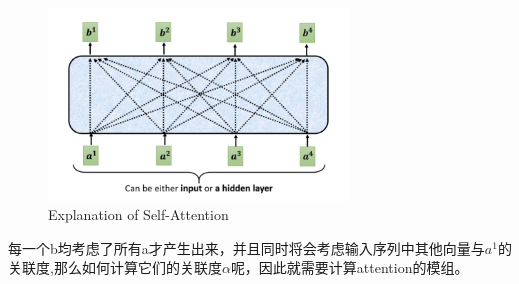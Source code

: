 \documentclass{article}
\begin{document}
\begin{figure}[H]
    \centering
    \includegraphics[width=8cm]{picture/SelfAttention1.png}
    \caption{Explanation of Self-Attention}
    \label{fig:galxy}
\end{figure}

\indent 每一个b均考虑了所有a才产生出来，并且同时将会考虑输入序列中其他向量与\(a^{1}\)的关联度,那么如何计算它们的关联度\( \alpha \)呢，因此就需要计算attention的模组。  \par
\end{document}

